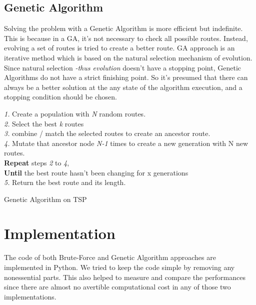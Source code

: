 \documentclass[journal,transmag]{IEEEtran}
\begin{document}
    \subsection{Genetic Algorithm}

    Solving the problem with a Genetic Algorithm is more efficient but
    indefinite. This is because in a GA, it's not necessary to check all
    possible routes. Instead, evolving a set of routes is tried to create a
    better route. GA approach is an iterative method which is based on the
    natural selection mechanism of evolution. Since natural selection
    \textit{-thus evolution} doesn't have a stopping point, Genetic Algorithms
    do not have a strict finishing point. So it's presumed that there can always be
    a better solution at the any state of the algorithm execution, and a
    stopping condition should be chosen.

    \begin{algorithm} %
        \textit{1.} Create a population with \textit{N} random routes. \\
        \textit{2.} Select the best \textit{k} routes \\
        \textit{3.} combine / match the selected routes to create an ancestor
        route. \\
        \textit{4.} Mutate that ancestor node \textit{N-1} times to create a new
        generation with N new routes. \\
        \textbf{Repeat} steps \textit{2} to \textit{4}, \\
        \textbf{Until} the best route hasn't been changing for x generations \\
        \textit{5.} Return the best route and its length.


        \caption{Genetic Algorithm on TSP} %
        \label{alg2} %

    \end{algorithm}

    \section{Implementation}

    The code \cite{code_repository} of both Brute-Force and Genetic Algorithm
    approaches are implemented in Python. We tried to keep the code simple by
    removing any nonessential parts. This also helped to measure and compare the
    performances since there are almost no avertible computational cost in any
    of those two implementations.
\end{document}
